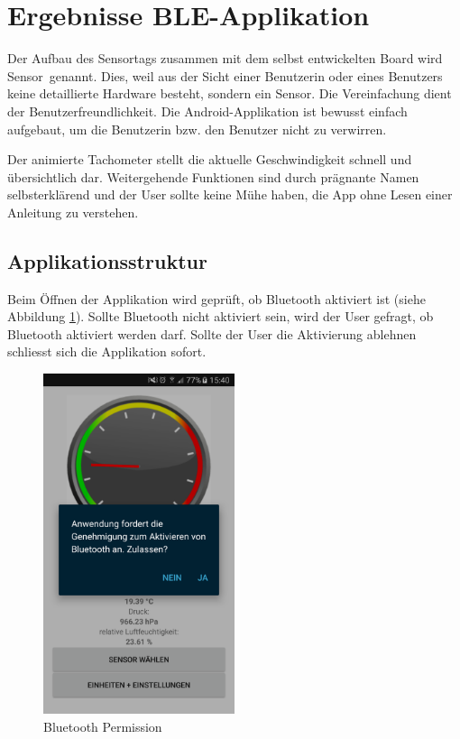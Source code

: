 \section{Ergebnisse BLE-Applikation}

Der Aufbau des Sensortags zusammen mit dem selbst entwickelten Board wird \glqq Sensor\grqq\thinspace\ genannt. Dies, weil aus der Sicht einer Benutzerin oder eines Benutzers keine detaillierte Hardware besteht, sondern \glqq ein Sensor\grqq. Die Vereinfachung dient der Benutzerfreundlichkeit. Die Android-Applikation ist bewusst einfach aufgebaut, um die Benutzerin bzw. den Benutzer nicht zu verwirren. 

Der animierte Tachometer stellt die aktuelle Geschwindigkeit schnell und übersichtlich dar. Weitergehende Funktionen sind durch prägnante Namen selbsterklärend und der User sollte keine Mühe haben, die App ohne Lesen einer Anleitung zu verstehen.

\subsection{Applikationsstruktur}

Beim Öffnen der Applikation wird geprüft, ob Bluetooth aktiviert ist (siehe Abbildung \ref{permission}). Sollte Bluetooth nicht aktiviert sein, wird der User gefragt, ob Bluetooth aktiviert werden darf. Sollte der User die Aktivierung ablehnen schliesst sich die Applikation sofort.

\begin{figure}[ht]
    \includegraphics[width=0.5\textwidth]{4Resultate/imag/BLEBluetoothPermission.png} 
    \caption{Bluetooth Permission}
    \label{permission}
\end{figure}

